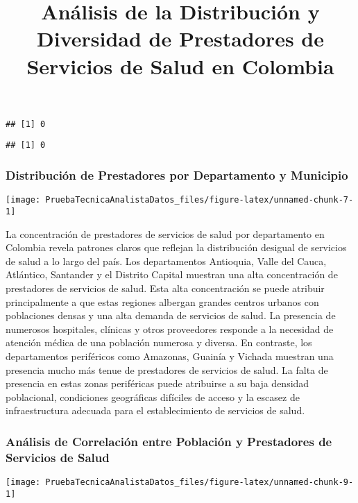 \documentclass[
]{article}
\title{Análisis de la Distribución y Diversidad de Prestadores de
Servicios de Salud en Colombia}
\author{}
\date{\vspace{-2.5em}}
\begin{document}
\maketitle

\begin{verbatim}
## [1] 0
\end{verbatim}

\begin{verbatim}
## [1] 0
\end{verbatim}

\subsubsection{Distribución de Prestadores por Departamento y
Municipio}\label{distribuciuxf3n-de-prestadores-por-departamento-y-municipio}

\begin{center}\texttt{[image: PruebaTecnicaAnalistaDatos\_files/figure-latex/unnamed-chunk-7-1]} \end{center}

La concentración de prestadores de servicios de salud por departamento
en Colombia revela patrones claros que reflejan la distribución desigual
de servicios de salud a lo largo del país. Los departamentos Antioquia,
Valle del Cauca, Atlántico, Santander y el Distrito Capital muestran una
alta concentración de prestadores de servicios de salud. Esta alta
concentración se puede atribuir principalmente a que estas regiones
albergan grandes centros urbanos con poblaciones densas y una alta
demanda de servicios de salud. La presencia de numerosos hospitales,
clínicas y otros proveedores responde a la necesidad de atención médica
de una población numerosa y diversa. En contraste, los departamentos
periféricos como Amazonas, Guainía y Vichada muestran una presencia
mucho más tenue de prestadores de servicios de salud. La falta de
presencia en estas zonas periféricas puede atribuirse a su baja densidad
poblacional, condiciones geográficas difíciles de acceso y la escasez de
infraestructura adecuada para el establecimiento de servicios de salud.

\subsubsection{Análisis de Correlación entre Población y Prestadores de
Servicios de
Salud}\label{anuxe1lisis-de-correlaciuxf3n-entre-poblaciuxf3n-y-prestadores-de-servicios-de-salud}

\begin{center}\texttt{[image: PruebaTecnicaAnalistaDatos\_files/figure-latex/unnamed-chunk-9-1]} \end{center}
\end{document}
